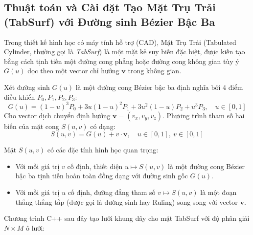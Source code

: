\subsection{Thuật toán và Cài đặt Tạo Mặt Trụ Trải (TabSurf) với Đường sinh Bézier Bậc Ba}
\label{subsec:tabsurf_bezier}

Trong thiết kế hình học có máy tính hỗ trợ (CAD), Mặt Trụ Trải (Tabulated Cylinder, thường gọi là \textit{TabSurf}) là một mặt kẻ suy biến đặc biệt, được kiến tạo bằng cách tịnh tiến một đường cong phẳng hoặc đường cong không gian tùy ý $G(u)$ dọc theo một vector chỉ hướng $\mathbf{v}$ trong không gian.

Xét đường sinh $G(u)$ là một đường cong Bézier bậc ba định nghĩa bởi 4 điểm điều khiển $P_0, P_1, P_2, P_3$:
\begin{equation}
G(u) = (1-u)^3 P_0 + 3u(1-u)^2 P_1 + 3u^2(1-u) P_2 + u^3 P_3, \quad u \in [0, 1]
\end{equation}
Cho vector dịch chuyển định hướng $\mathbf{v} = (v_x, v_y, v_z)$. Phương trình tham số hai biến của mặt cong $S(u, v)$ có dạng:
\begin{equation}
\label{eq:tabsurf_parametric}
S(u, v) = G(u) + v \cdot \mathbf{v}, \quad u \in [0, 1], \ v \in [0, 1]
\end{equation}

Mặt $S(u, v)$ có các đặc tính hình học quan trọng:
\begin{itemize}
    \item Với mỗi giá trị $v$ cố định, thiết diện $u \mapsto S(u, v)$ là một đường cong Bézier bậc ba tịnh tiến hoàn toàn đồng dạng với đường sinh gốc $G(u)$.
    \item Với mỗi giá trị $u$ cố định, đường đẳng tham số $v \mapsto S(u, v)$ là một đoạn thẳng thẳng tắp (được gọi là đường sinh hay Ruling) song song với vector $\mathbf{v}$.
\end{itemize}

Chương trình C++ sau đây tạo lưới khung dây cho mặt TabSurf với độ phân giải $N \times M$ ô lưới:

